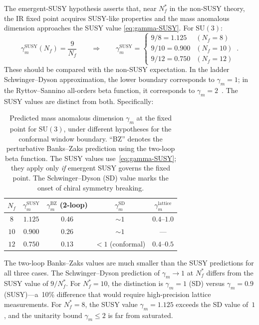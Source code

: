 \documentclass[11pt,a4paper]{article}
\theoremstyle{plain}
\theoremstyle{definition}
\theoremstyle{remark}
\newcommand{\Nf}{N_{\!f}}
\newcommand{\Nfstar}{\Nf^*}
\newcommand{\SU}[1]{\mathrm{SU}(#1)}
\newcommand{\BZ}{\ensuremath{\mathrm{BZ}}}
\begin{document}
The emergent-SUSY hypothesis asserts that, near $\Nfstar$ in the
non-SUSY theory, the IR fixed point acquires SUSY-like properties and
the mass anomalous dimension approaches the SUSY value
\eqref{eq:gamma-SUSY}.  For $\SU{3}$:
\begin{equation}\label{eq:gamma-values}
  \gamma_m^{\mathrm{SUSY}}(\Nf) = \frac{9}{\Nf}
  \qquad \Longrightarrow \qquad
  \gamma_m^{\mathrm{SUSY}} =
  \begin{cases}
    9/8  = 1.125 & (\Nf = 8) \\
    9/10 = 0.900 & (\Nf = 10) \\
    9/12 = 0.750 & (\Nf = 12)
  \end{cases}\,.
\end{equation}
These should be compared with the non-SUSY expectation.  In the
ladder Schwinger--Dyson approximation, the lower boundary corresponds
to $\gamma_m = 1$; in the Ryttov--Sannino all-orders beta function, it
corresponds to $\gamma_m = 2$~\cite{RS2008}.  The SUSY values are
distinct from both.  Specifically:

\begin{table}[ht]
\centering
\renewcommand{\arraystretch}{1.3}
\caption{Predicted mass anomalous dimension $\gamma_m$ at the fixed
  point for $\SU{3}$, under different hypotheses for the conformal
  window boundary.  ``BZ'' denotes the perturbative Banks--Zaks
  prediction using the two-loop beta function.  The SUSY values
  use~\eqref{eq:gamma-SUSY}; they apply only \emph{if} emergent SUSY
  governs the fixed point.  The Schwinger--Dyson (SD) value marks the
  onset of chiral symmetry breaking.}
\label{tab:gamma-predictions}
\begin{tabular}{@{} c c c c c @{}}
\toprule
$\Nf$ & $\gamma_m^{\mathrm{SUSY}}$ &
  $\gamma_m^{\BZ}$ (2-loop) &
  $\gamma_m^{\mathrm{SD}}$ &
  $\gamma_m^{\mathrm{lattice}}$ \\
\midrule
$8$  & $1.125$ & $0.46$ & $\sim 1$ &
  $0.4$--$1.0$ \\
$10$ & $0.900$ & $0.26$ & $\sim 1$ & --- \\
$12$ & $0.750$ & $0.13$ & $< 1$ (conformal) &
  $0.4$--$0.5$ \\
\bottomrule
\end{tabular}
\end{table}

The two-loop Banks--Zaks values are much smaller than the SUSY
predictions for all three cases.  The Schwinger--Dyson prediction of
$\gamma_m \to 1$ at $\Nfstar$ differs from the SUSY value of $9/\Nfstar$.
For $\Nfstar = 10$, the distinction is $\gamma_m = 1$ (SD)
versus $\gamma_m = 0.9$ (SUSY)---a~10\% difference that would require
high-precision lattice measurements.  For $\Nfstar = 8$, the SUSY
value $\gamma_m = 1.125$ exceeds the SD value of~$1$, and the
unitarity bound $\gamma_m \leq 2$ is far from saturated.
\end{document}
